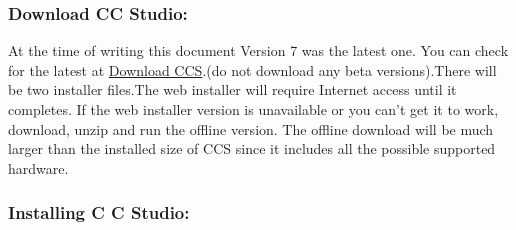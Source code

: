\documentclass[a4paper,10pt,oneside]{article}
\begin{document}
			\subsubsection{\Large\textbf{Download CC Studio:}}
			{\large At the time of writing this document Version 7 was the latest one. You can check for the latest at \href{http://processors.wiki.ti.com/index.php/Download_CCS}{Download CCS}.(do not download
				any beta versions).There will be two installer files.The web installer will require Internet access until it	completes. If the web installer version is unavailable or you can’t get it to work,
				download, unzip and run the offline version. The offline download will be much larger
				than the installed size of CCS since it includes all the possible supported hardware.}
			\subsubsection{\Large\textbf{Installing C C Studio:}}
\end{document}
